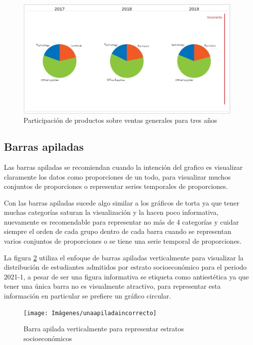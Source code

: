 \documentclass[
]{book}
\begin{document}
\begin{figure}

{\centering \includegraphics[width=1\linewidth]{Imágenes/circularañosincorrecto} 

}

\caption{Participación de productos sobre ventas generales para tres años}\label{fig:circulartiempoincorrecto-fig}
\end{figure}

\hypertarget{barras-apiladas}{%
\subsection{Barras apiladas}\label{barras-apiladas}}

Las barras apiladas se recomiendan cuando la intención del grafico es visualizar claramente los datos como proporciones de un todo, para visualizar muchos conjuntos de proporciones o representar series temporales de proporciones.

Con las barras apiladas sucede algo similar a los gráficos de torta ya que tener muchas categorías saturan la visualización y la hacen poco informativa, nuevamente es recomendable para representar no más de 4 categorías y cuidar siempre el orden de cada grupo dentro de cada barra cuando se representan varios conjuntos de proporciones o se tiene una serie temporal de proporciones.

La figura \ref{fig:apiladaantiestetica-fig} utiliza el enfoque de barras apiladas verticalmente para visualizar la distribución de estudiantes admitidos por estrato socioeconómico para el periodo 2021-1, a pesar de ser una figura informativa se etiqueta como antiestética ya que tener una única barra no es visualmente atractivo, para representar esta información en particular se prefiere un gráfico circular.

\begin{figure}

{\centering \texttt{[image: Imágenes/unaapiladaincorrecto]} 

}

\caption{Barra apilada verticalmente para representar estratos socioeconómicos}\label{fig:apiladaantiestetica-fig}
\end{figure}
\end{document}

